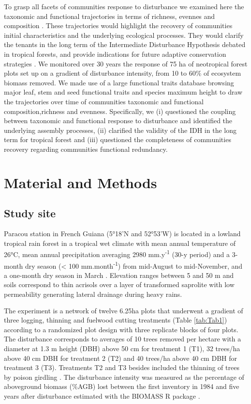 \documentclass[fleqn,10pt]{ArtEcoFoG} %
\theoremstyle{definition}
\theoremstyle{definition}
\theoremstyle{definition}
\theoremstyle{remark}
\begin{document}
To grasp all facets of communities response to disturbance we examined
here the taxonomic and functional trajectories in terms of richness,
evennes and composition \citep{Lohbeck2015, Guariguata2001}. These
trajectories would highlight the recovery of communities initial
characteristics and the underlying ecological processes. They would
clarify the tenants in the long term of the Intermediate Disturbance
Hypothesis debated in tropical forests, and provide indications for
future adaptive conservation strategies \citep{Adler2007}. We monitored
over 30 years the response of 75 ha of neotropical forest plots set up
on a gradient of disturbance intensity, from 10 to 60\% of ecosystem
biomass removed. We made use of a large functional traits database
browsing major leaf, stem and seed functional traits and species maximum
height to draw the trajectories over time of communities taxonomic and
functional composition,richness and evenness. Specifically, we (i)
questioned the coupling between taxonomic and functional response to
disturbance and identified the underlying assembly processes, (ii)
clarified the validity of the IDH in the long term for tropical forest
and (iii) questioned the completeness of communities recovery regarding
communities functional redundancy.

\section{Material and Methods}\label{material-and-methods}

\subsection{Study site}\label{study-site}

Paracou station in French Guiana (5°18'N and 52°53'W) is located in a
lowland tropical rain forest in a tropical wet climate with mean annual
temperature of 26°C, mean annual precipitation averaging 2980
mm.y\textsuperscript{-1} (30-y period) and a 3-month dry season
(\textless{} 100 mm.month\textsuperscript{-1}) from mid-August to
mid-November, and a one-month dry season in March \citep{Wagner2011}.
Elevation ranges between 5 and 50 m and soils correspond to thin
acrisols over a layer of transformed saprolite with low permeability
generating lateral drainage during heavy rains.

The experiment is a network of twelve 6.25ha plots that underwent a
gradient of three logging, thinning and fuelwood cutting treatments
(Table \ref{tab:Tab1}) according to a randomized plot design with three
replicate blocks of four plots. The disturbance corresponds to averages
of 10 trees removed per hectare with a diameter at 1.3 m height (DBH)
above 50 cm for treatment 1 (T1), 32 trees/ha above 40 cm DBH for
treatment 2 (T2) and 40 trees/ha above 40 cm DBH for treatment 3 (T3).
Treatments T2 and T3 besides included the thinning of trees by poison
girdling \citep{Schmitt1990, Blanc2009}. The disturbance intensity was
measured as the percentage of aboveground biomass (\%AGB) lost between
the first inventory in 1984 and five years after disturbance
\citep{Piponiot2016} estimated with the BIOMASS R package
\citep{Biomass2018}.
\end{document}
